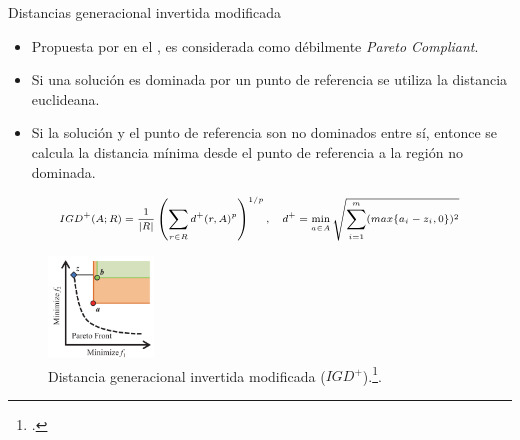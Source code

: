 \documentclass{beamer}
\begin{document}
\begin{frame}{Distancias generacional invertida modificada}
\begin{itemize}
\justifying
\scriptsize
\item Propuesta por \citeauthor{Joel:IGDPlus_And_GDPlus} en el \citeyear{Joel:IGDPlus_And_GDPlus}, es considerada como débilmente \textit{Pareto Compliant}.
\item Si una solución es dominada por un punto de referencia se utiliza la distancia euclideana.
\item Si la solución y el punto de referencia son no dominados entre sí, entonce se calcula la distancia mínima desde el punto de referencia a la región no dominada.
\end{itemize}
\begin{equation*}
\scriptsize
\begin{split}
IGD^+(A; R) = \frac{1}{|R|} \left (   \sum_{r \in R} d^+(r, A)^p \right)^{1/p}, \quad d^+ = \min_{a \in A} \sqrt{\sum_{i=1}^m (max\{ a_i - z_i, 0\})^2}
\end{split}
\end{equation*}


\begin{figure}[H]
\centering
\includegraphics[width=0.25\textwidth]{igd_3.png}
\caption{\scriptsize Distancia generacional invertida modificada ($IGD^+$).\footcite{ishibuchi2016sensitivity}.}
\end{figure}
\end{frame}
\end{document}
